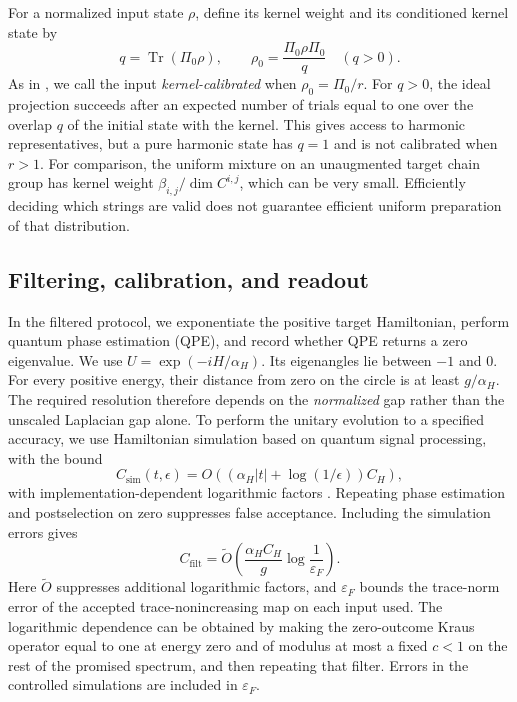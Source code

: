\documentclass[a4paper,onecolumn,unpublished]{quantumarticle}
\theoremstyle{plain}
\theoremstyle{definition}
\theoremstyle{definition}
\numberwithin{equation}{section}
\begin{document}
For a normalized input state $\rho$, define its kernel weight and its
conditioned kernel state by
\begin{equation}\label{eq:protocol-calibration}
 q=\operatorname{Tr}(\Pi_0\rho),\qquad
 \rho_0=\frac{\Pi_0\rho\Pi_0}{q}\quad(q>0).
\end{equation}
As in , we call the input
\emph{kernel-calibrated} when $\rho_0=\Pi_0/r$.
For $q>0$, the ideal projection succeeds after an expected number of
trials equal to one over the overlap $q$ of the initial state with the kernel.
This gives access to harmonic representatives, but a pure harmonic
state has $q=1$ and is not calibrated when $r>1$.
For comparison, the uniform mixture on an unaugmented target chain
group has kernel weight $\beta_{i,j}/\dim C^{i,j}$, which can be very
small. Efficiently deciding which strings are valid does not guarantee
efficient uniform preparation of that distribution.

\subsection{Filtering, calibration, and readout}
\label{subsec:Kh-performance}

In the filtered protocol, we exponentiate the positive target Hamiltonian,
perform quantum phase estimation (QPE), and record whether QPE returns
a zero eigenvalue. We use $U=\exp(-iH/\alpha_H)$.
Its eigenangles lie between $-1$ and $0$.
For every positive energy, their distance from zero on the circle is
at least $g/\alpha_H$. The required resolution therefore depends on
the \emph{normalized} gap rather than the unscaled Laplacian gap alone.
To perform the unitary evolution to a specified accuracy, we use
Hamiltonian simulation based on quantum signal processing, with the bound
\begin{equation}\label{eq:simulation-cost}
 C_{\mathrm{sim}}(t,\epsilon)
 =O\!\left((\alpha_H|t|+\log(1/\epsilon))C_H\right),
\end{equation}
with implementation-dependent logarithmic factors
\cite{LowChuang,GilyenSuLowWiebe2019}. Repeating phase estimation
and postselection on zero suppresses false acceptance. Including
the simulation errors gives
\begin{equation}\label{eq:filter-cost}
 C_{\mathrm{filt}}
 =\widetilde O\!\left(\frac{\alpha_H C_H}{g}
                   \log\frac1{\varepsilon_F}\right).
\end{equation}
Here $\widetilde O$ suppresses additional logarithmic factors, and
$\varepsilon_F$ bounds the trace-norm error of the accepted
trace-nonincreasing map on each input used. The logarithmic dependence
can be obtained by making the zero-outcome Kraus operator
equal to one at energy zero and of modulus at most a fixed $c<1$
on the rest of the promised spectrum, and then repeating that filter.
Errors in the controlled simulations are included in
$\varepsilon_F$.
\end{document}
